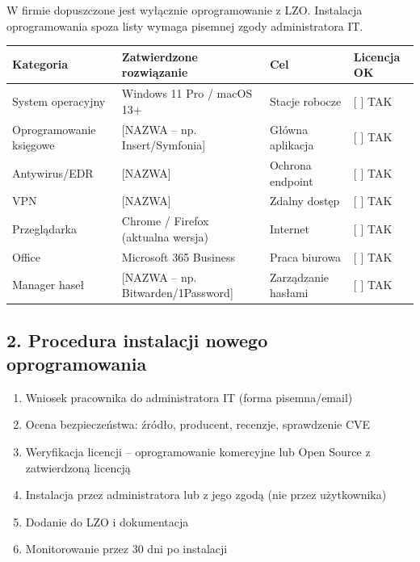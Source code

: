 \documentclass[12pt,a4paper]{article}
\providecommand{\tightlist}{\setlength{\itemsep}{0pt}\setlength{\parskip}{0pt}}
\begin{document}
W firmie dopuszczone jest wyłącznie oprogramowanie z LZO. Instalacja
oprogramowania spoza listy wymaga pisemnej zgody administratora IT.

\begin{longtable}[]{@{}>{\raggedright\arraybackslash}p{}>{\raggedright\arraybackslash}p{}>{\raggedright\arraybackslash}p{}>{\raggedright\arraybackslash}p{}@{}}
\toprule\noalign{}
Kategoria & Zatwierdzone rozwiązanie & Cel & Licencja OK \\
\midrule\noalign{}
\endhead
\bottomrule\noalign{}
\endlastfoot
System operacyjny & Windows 11 Pro / macOS 13+ & Stacje robocze & {[}
{]} TAK \\
Oprogramowanie księgowe & {[}NAZWA -- np. Insert/Symfonia{]} & Główna
aplikacja & {[} {]} TAK \\
Antywirus/EDR & {[}NAZWA{]} & Ochrona endpoint & {[} {]} TAK \\
VPN & {[}NAZWA{]} & Zdalny dostęp & {[} {]} TAK \\
Przeglądarka & Chrome / Firefox (aktualna wersja) & Internet & {[} {]}
TAK \\
Office & Microsoft 365 Business & Praca biurowa & {[} {]} TAK \\
Manager haseł & {[}NAZWA -- np. Bitwarden/1Password{]} & Zarządzanie
hasłami & {[} {]} TAK \\
\end{longtable}

\subsection{2. Procedura instalacji nowego
oprogramowania}\label{procedura-instalacji-nowego-oprogramowania}

\begin{enumerate}
\tightlist
\item
  Wniosek pracownika do administratora IT (forma pisemna/email)
\item
  Ocena bezpieczeństwa: źródło, producent, recenzje, sprawdzenie CVE
\item
  Weryfikacja licencji -- oprogramowanie komercyjne lub Open Source z
  zatwierdzoną licencją
\item
  Instalacja przez administratora lub z jego zgodą (nie przez
  użytkownika)
\item
  Dodanie do LZO i dokumentacja
\item
  Monitorowanie przez 30 dni po instalacji
\end{enumerate}
\end{document}
